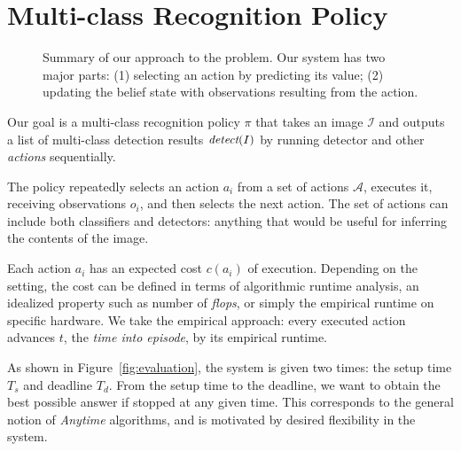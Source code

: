 \section{Multi-class Recognition Policy} \label{sec:tech}
\begin{figure}[h!]
  \caption{Summary of our approach to the problem. Our system has two major parts: (1) selecting an action by predicting its value; (2) updating the belief state with observations resulting from the action.}
  \label{fig:pomdp}
\end{figure}

Our goal is a multi-class recognition policy $\pi$ that takes an image $\mathcal{I}$ and outputs a list of multi-class detection results $\emph{detect}(I)$ by running detector and other \emph{actions} sequentially.

The policy repeatedly selects an action $a_i$ from a set of actions $\mathcal{A}$, executes it, receiving observations $o_i$, and then selects the next action.
The set of actions can include both classifiers and detectors: anything that would be useful for inferring the contents of the image.

Each action $a_i$ has an expected cost $c(a_i)$ of execution.
Depending on the setting, the cost can be defined in terms of algorithmic runtime analysis, an idealized property such as number of \emph{flops}, or simply the empirical runtime on specific hardware.
We take the empirical approach: every executed action advances $t$, the \emph{time into episode}, by its empirical runtime.

As shown in Figure~\ref{fig:evaluation}, the system is given two times: the setup time $T_s$ and deadline $T_d$.
From the setup time to the deadline, we want to obtain the best possible answer if stopped at any given time.
This corresponds to the general notion of \emph{Anytime} algorithms, and is motivated by desired flexibility in the system.

